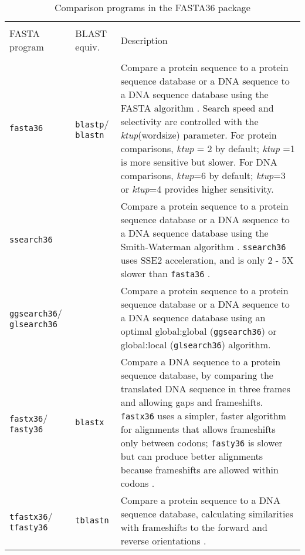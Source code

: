 \documentclass[11pt]{article}
\begin{document}
\begin{table}
\caption{\label{table1} Comparison programs in the FASTA36 package}
\vspace{0.5ex}
\begin{tabular}{ p{0.8in} p{0.6in} p{4.6 in}}
\hline \\[-1.0ex]
FASTA \mbox{program} & BLAST equiv. & Description \\[1.2ex]
\hline \\[-1.0ex]
\texttt{fasta36} & \texttt{blastp}/ \texttt{blastn} &
Compare a protein sequence to a protein sequence 
database or a DNA sequence to a DNA sequence database using the FASTA 
algorithm \cite{wrp881,wrp960}.  Search speed and selectivity are 
controlled with the \emph{ktup}(wordsize) parameter.  For protein 
comparisons, \emph{ktup} = 2 by default; \emph{ktup} =1 is more sensitive 
but slower.  For DNA comparisons, \emph{ktup}=6 by default; \emph{ktup}=3 or 
\emph{ktup}=4 provides higher sensitivity.\\[1 ex]

\texttt{ssearch36} &  & Compare a protein sequence to a protein sequence 
database or a DNA sequence to a DNA sequence database using the 
Smith-Waterman algorithm \cite{wat815}. \texttt{ssearch36} uses SSE2
acceleration, and is only 2 - 5X slower than \texttt{fasta36} \cite{farrar2007}. \\[1 ex]

\texttt{ggsearch36}/ \texttt{glsearch36} &  & Compare a protein sequence to a protein sequence 
database or a DNA sequence to a DNA sequence database using
an optimal global:global (\texttt{ggsearch36}) or global:local
(\texttt{glsearch36}) algorithm.\\[1 ex]

\texttt{fastx36}/ \texttt{fasty36} & \texttt{blastx} &
Compare a DNA sequence to a protein
sequence database, by comparing the translated DNA sequence in three
frames and allowing gaps and frameshifts.  \texttt{fastx36} uses a
simpler, faster algorithm for alignments that allows frameshifts only
between codons; \texttt{fasty36} is slower but can produce better alignments
because frameshifts are allowed within codons \cite{wrp971}.\\[1 ex]

\texttt{tfastx36}/ \texttt{tfasty36}& \texttt{tblastn} &
Compare a protein sequence to a DNA sequence
database, calculating similarities with frameshifts to the forward and
reverse orientations  \cite{wrp971}.\\[1 ex]


\end{tabular}
\end{table}
\end{document}
